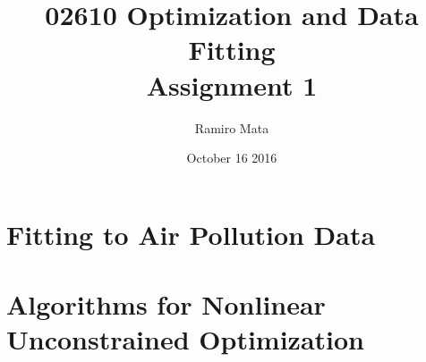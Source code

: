
\author{Ramiro Mata}
\title{02610 Optimization and Data Fitting \\ \Large{Assignment 1}}
\date{October 16 2016}

\maketitle
\thispagestyle{fancy}
\section{Fitting to Air Pollution Data}


\clearpage
\section{Algorithms for Nonlinear Unconstrained Optimization}


\newpage
{}
\appendix




